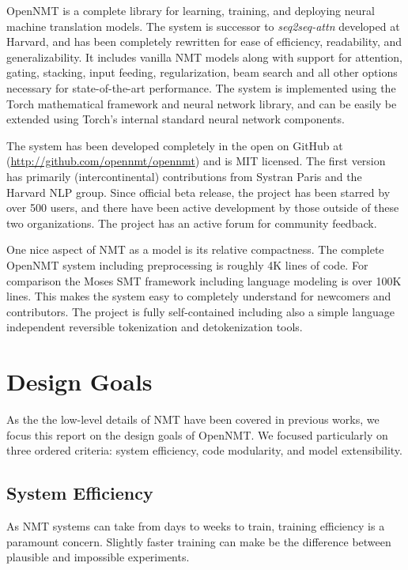 \documentclass[11pt]{article}
\begin{document}
OpenNMT is a complete library for learning, training, and
deploying neural machine translation models. The system is successor
to  \textit{seq2seq-attn} developed at Harvard, and has been completely rewritten for ease of efficiency, readability, and generalizability. It includes 
vanilla NMT models along with support for attention, gating, stacking,
input feeding, regularization, beam search and all other options necessary
for state-of-the-art performance.  
The system is implemented using the Torch mathematical framework and
neural network library, and can be easily be extended using Torch's
internal standard neural network components. 

The system has been developed completely in the open on GitHub at
(\url{http://github.com/opennmt/opennmt}) and is MIT licensed.  The
first version has primarily (intercontinental) contributions from
Systran Paris and the Harvard NLP group. Since official beta release,
the project has been starred by over 500 users, and there have been
active development by those outside of these two organizations. The
project has an active forum for community feedback.


One nice aspect of NMT as a model is its relative compactness. The
complete OpenNMT system including preprocessing is roughly 4K lines of
code. For comparison the Moses SMT framework including language
modeling is over 100K lines. This makes the system easy to completely
understand for newcomers and contributors. The project is fully self-contained
including also a simple language independent reversible tokenization and
detokenization tools.



\section{Design Goals}


As the the low-level details of NMT have been covered in previous
works, we focus this report on the design goals of
OpenNMT. We focused particularly on three ordered criteria:
system efficiency, code modularity, and model extensibility. 

\subsection{System Efficiency}

As NMT systems can take from days to weeks to train, training
efficiency is a paramount concern. Slightly faster training can make be the difference between
plausible and impossible experiments.
\end{document}
